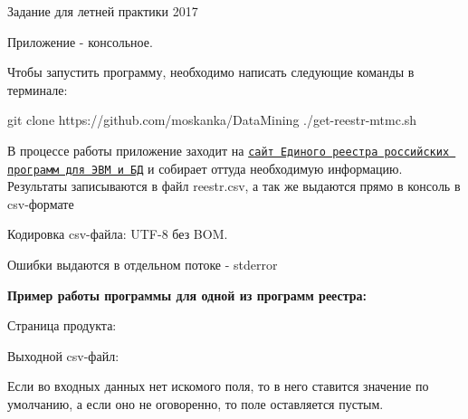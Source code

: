 
\begin{DoxyItemize}
\item Задание для летней практики 2017
\end{DoxyItemize}

Приложение -\/ консольное.

Чтобы запустить программу, необходимо написать следующие команды в терминале\+: 
\begin{DoxyCode}
git clone https://github.com/moskanka/DataMining
./get-reestr-mtmc.sh
\end{DoxyCode}


В процессе работы приложение заходит на \href{https://reestr.minsvyaz.ru/reestr/}{\tt сайт Единого реестра российских программ для ЭВМ и БД} и собирает оттуда необходимую информацию. Результаты записываются в файл {\ttfamily reestr.\+csv}, а так же выдаются прямо в консоль в {\ttfamily csv}-\/формате

Кодировка {\ttfamily csv}-\/файла\+: U\+T\+F-\/8 без B\+OM.

Ошибки выдаются в отдельном потоке -\/ {\ttfamily stderror}

{\bfseries Пример работы программы для одной из программ реестра\+:}


\begin{DoxyItemize}
\item Страница продукта\+: 
\item Выходной {\ttfamily csv}-\/файл\+: 
\item Если во входных данных нет искомого поля, то в него ставится значение по умолчанию, а если оно не оговоренно, то поле оставляется пустым. 
\end{DoxyItemize}